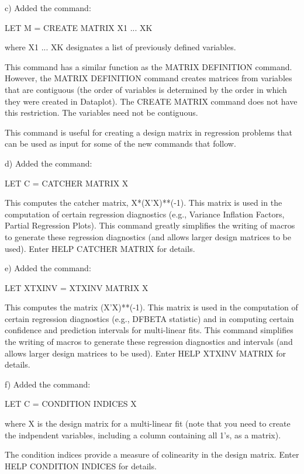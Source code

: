 {    c) Added the command:

          LET M = CREATE MATRIX X1 ... XK

       where X1 ... XK designates a list of previously defined
       variables.

       This command has a similar function as the MATRIX DEFINITION
       command.  However, the MATRIX DEFINITION command
       creates matrices from variables that are contiguous
       (the order of variables is determined by the order
       in which they were created in Dataplot).  The
       CREATE MATRIX command does not have this restriction.
       The variables need not be contiguous.
       

       This command is useful for creating a design matrix
       in regression problems that can be used as input for
       some of the new commands that follow.

    d) Added the command:

          LET C = CATCHER MATRIX X

       This computes the catcher matrix, X*(X'X)**(-1).  This
       matrix is used in the computation of certain regression
       diagnostics (e.g., Variance Inflation Factors, Partial
       Regression Plots).  This command greatly simplifies the
       writing of macros to generate these regression diagnostics
       (and allows larger design matrices to be used).  Enter
       HELP CATCHER MATRIX for details.

    e) Added the command:

          LET XTXINV = XTXINV MATRIX X

       This computes the matrix (X'X)**(-1).  This
       matrix is used in the computation of certain regression
       diagnostics (e.g., DFBETA statistic) and in computing
       certain confidence and prediction intervals for multi-linear
       fits.  This command simplifies the writing of macros to
       generate these regression diagnostics and intervals
       (and allows larger design matrices to be used).  Enter
       HELP XTXINV MATRIX for details.

    f) Added the command:

          LET C = CONDITION INDICES X

       where X is the design matrix for a multi-linear fit
       (note that you need to create the indpendent variables,
       including a column containing all 1's, as a matrix).

       The condition indices provide a measure of colinearity
       in the design matrix.  Enter HELP CONDITION INDICES for
       details.

}
